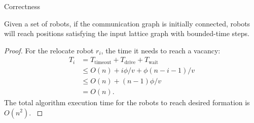 \begin{frame}{Correctness}
  \begin{theorem}
    Given a set of robots, if the
    communication graph is initially connected, robots will reach
    positions satisfying the input lattice graph with bounded-time steps.
  \end{theorem}
  \begin{proof}
    \small{For the relocate robot $r_i$, the time it needs to reach a vacancy: 
    \begin{equation*}
      \begin{split}
        T_i & = T_{\textrm{timeout}} + T_{\textrm{drive}} + T_{\textrm{wait}}  \\
        & \leq O(n)+ i\phi/v + \phi(n-i-1)/v \\
        & \leq O(n) + (n-1)\phi/v\\
        & = O(n).
      \end{split}
    \end{equation*}
    The total algorithm execution time for the robots to reach desired formation is $O(n^2)$.
    }
  \end{proof}
\end{frame}